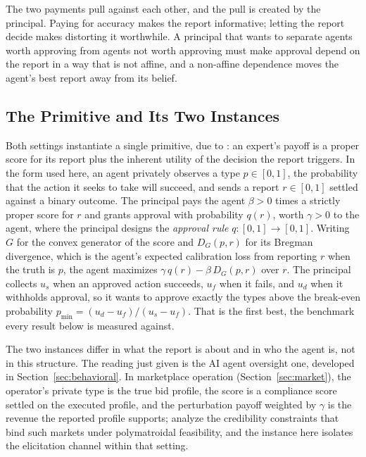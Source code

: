 \documentclass[acmsmall,nonacm,screen]{acmart}
\theoremstyle{acmplain}%
\theoremstyle{acmdefinition}%
\numberwithin{equation}{section}
\begin{document}
The two payments pull against each other, and the pull is created by the principal. Paying for accuracy makes the report informative; letting the report decide makes distorting it worthwhile. A principal that wants to separate agents worth approving from agents not worth approving must make approval depend on the report in a way that is not affine, and a non-affine dependence moves the agent's best report away from its belief.

\subsection{The Primitive and Its Two Instances}
\label{sec:primitive}

Both settings instantiate a single primitive, due to \citet{boutilier2012eliciting}: an expert's payoff is a proper score for its report plus the inherent utility of the decision the report triggers. In the form used here, an agent privately observes a type $p \in [0,1]$, the probability that the action it seeks to take will succeed, and sends a report $r \in [0,1]$ settled against a binary outcome. The principal pays the agent $\beta > 0$ times a strictly proper score for $r$ and grants approval with probability $q(r)$, worth $\gamma > 0$ to the agent, where the principal designs the \emph{approval rule} $q : [0,1] \to [0,1]$. Writing $G$ for the convex generator of the score and $D_G(p,r)$ for its Bregman divergence, which is the agent's expected calibration loss from reporting $r$ when the truth is $p$, the agent maximizes $\gamma\, q(r) - \beta\, D_G(p,r)$ over $r$. The principal collects $u_s$ when an approved action succeeds, $u_f$ when it fails, and $u_d$ when it withholds approval, so it wants to approve exactly the types above the break-even probability $p_{\min} = (u_d - u_f)/(u_s - u_f)$. That is the first best, the benchmark every result below is measured against.

The two instances differ in what the report is about and in who the agent is, not in this structure. The reading just given is the AI agent oversight one, developed in Section~\ref{sec:behavioral}. In marketplace operation (Section~\ref{sec:market}), the operator's private type is the true bid profile, the score is a compliance score settled on the executed profile, and the perturbation payoff weighted by $\gamma$ is the revenue the reported profile supports; \citet{loven2026trilemma} analyze the credibility constraints that bind such markets under polymatroidal feasibility, and the instance here isolates the elicitation channel within that setting.
\end{document}
